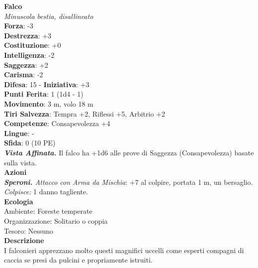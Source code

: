 \begin{multicols}{2}
\medskip\textbf{Falco}\\
\emph{Minuscola bestia, disallineato}\\
\textbf{Forza}: -3\\
\textbf{Destrezza}: +3\\
\textbf{Costituzione}: +0\\
\textbf{Intelligenza}: -2\\
\textbf{Saggezza}: +2\\
\textbf{Carisma}: -2\\
\textbf{Difesa}: 15 - \textbf{Iniziativa}: +3\\
\textbf{Punti Ferita}: 1 (1d4 - 1)\\
\textbf{Movimento}: 3 m, volo 18 m\\
\textbf{Tiri Salvezza}: Tempra +2, Riflessi +5, Arbitrio +2 \\
\textbf{Competenze}: Consapevolezza +4\\
\textbf{Lingue}: -\\
\textbf{Sfida}: 0 (10 PE)\smallskip\\
\emph{\textbf{Vista Affinata.}} Il falco ha +1d6 alle prove di Saggezza (Consapevolezza) basate sulla vista.\\
\smallskip\textbf{Azioni}\\
\emph{\textbf{Speroni.} Attacco con Arma da Mischia}: +7 al colpire, portata 1 m, un bersaglio.\\
\emph{Colpisce:} 1 danno tagliente. \\
\textbf{Ecologia}\\
Ambiente: Foreste temperate\\
Organizzazione: Solitario o coppia\\
Tesoro: Nessuno\\
\textbf{Descrizione}\\
I falconieri apprezzano molto questi magnifici uccelli come esperti compagni di caccia se presi da pulcini e propriamente istruiti. \\


\end{multicols}
